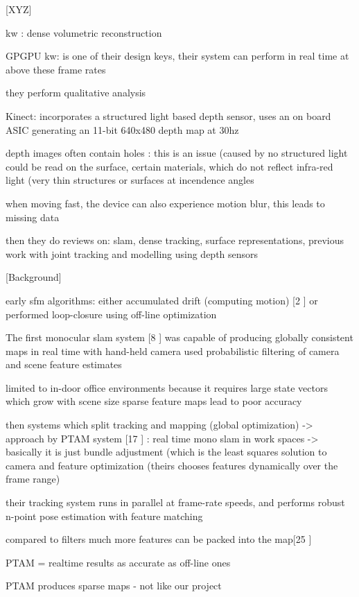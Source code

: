 [XYZ]

kw : dense volumetric reconstruction

GPGPU kw: is one of their design keys, their system can perform in real time at above these frame rates

they perform qualitative analysis

Kinect: incorporates a structured light based depth sensor, uses an on board ASIC generating an 11-bit 640x480 depth map at 30hz

depth images often contain holes : this is an issue (caused by no structured light could be read on the surface, certain materials, which do not reflect infra-red light (very thin structures or surfaces at incendence angles

when moving fast, the device can also experience motion blur, this leads to missing data

then they do  reviews on:
	slam, dense tracking, surface representations, previous work with joint tracking and modelling using depth sensors

[Background]

early sfm algorithms: either accumulated drift (computing motion) [2 \cite{Beardsley97Sequential} ] or performed loop-closure using off-line optimization 

The first monocular slam system [8 \cite{Davison03Real} ] was capable of producing globally consistent maps in real time with hand-held camera used probabilistic filtering of camera and scene feature estimates

limited to in-door office environments because it requires large state vectors which grow with scene size
sparse feature maps lead to poor accuracy

then systems which split tracking and mapping (global optimization) -> approach by PTAM system [17 \cite{Klein07Parallel}]
: real time mono slam in work spaces -> basically it is just bundle adjustment (which is the least squares solution to camera and feature optimization (theirs chooses features dynamically over the frame range)

their tracking system runs in parallel at frame-rate speeds, and performs robust n-point pose estimation with feature matching

compared to filters much more features can be packed into the map[25 \cite{Strasdat10Real} ]

PTAM = realtime results as accurate as off-line ones

PTAM produces sparse maps - not like our project

